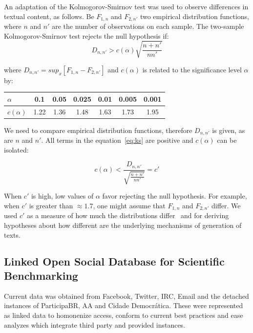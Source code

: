 An adaptation of the Kolmogorov-Smirnov test was used to observe differences in textual content, as follows.
Be $F_{1,n}$ and $F_{2,n'}$ two empirical distribution functions, where $n$ and $n'$ are the number of observations on each sample.
The two-sample Kolmogorov-Smirnov test rejects the null hypothesis if:
\begin{equation}\label{eq:ks}
D_{n,n'} > c(\alpha)\sqrt{\frac{n+n'}{nn'}}
\end{equation}

\noindent where $D_{n,n'}=sup_x[F_{1,n}-F_{2,n'}]$ and $c(\alpha)$ is related to the significance level $\alpha$ by:

\begin{table}[H]
\centering
\begin{tabular}{|l||c|c|c|c|c|c|}\hline
$\alpha$    & 0.1  & 0.05 & 0.025 & 0.01 & 0.005 & 0.001 \\\hline
$c(\alpha)$ & 1.22 & 1.36 & 1.48  & 1.63 & 1.73  & 1.95  \\\hline
\end{tabular}
\end{table}

We need to compare empirical distribution functions,
therefore $D_{n,n'}$ is given, as are $n$ and $n'$.
All terms in the equation~\ref{eq:ks} are positive and $c(\alpha)$ can be isolated:

\begin{equation}\label{eq:ks2}
c(\alpha) < \frac{D_{n,n'}}{\sqrt{\frac{n+n'}{nn'}}} = c'
\end{equation}

When $c'$ is high, low values of $\alpha$ favor rejecting the null hypothesis.
For example, when $c'$ is greater than $\approx 1.7$, one might assume that $F_{1,n}$ and $F_{2,n'}$ differ.
We used $c'$ as a measure of how much
the distributions differ~\cite{kolm}
and for deriving hypotheses
about how different are the underlying mechanisms of generation of texts.

\subsection{Linked Open Social Database for Scientific Benchmarking}
Current data was obtained from Facebook, Twitter, IRC, Email and the
detached instances of ParticipaBR, AA and Cidade Democr\'atica.
These were represented as linked data to homonenize access,
conform to current best practices and ease analyzes which integrate third
party and provided instances. 
 
